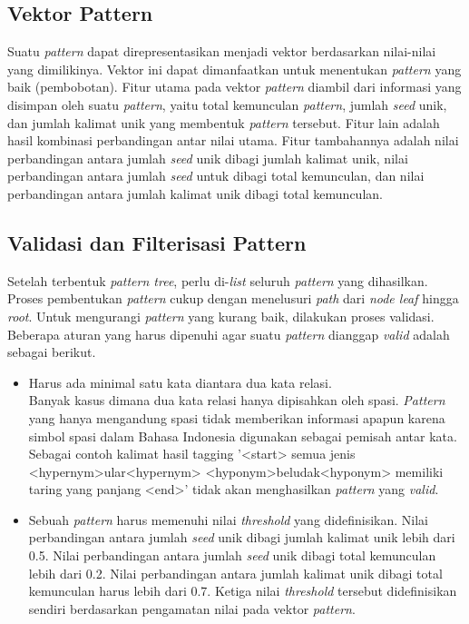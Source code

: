 \subsection{Vektor Pattern}
Suatu \textit{pattern} dapat direpresentasikan menjadi vektor berdasarkan nilai-nilai yang dimilikinya. Vektor ini dapat dimanfaatkan untuk menentukan \textit{pattern} yang baik (pembobotan). Fitur utama pada vektor \textit{pattern} diambil dari informasi yang disimpan oleh suatu \textit{pattern}, yaitu total kemunculan \textit{pattern}, jumlah \textit{seed} unik, dan jumlah kalimat unik yang membentuk \textit{pattern} tersebut. Fitur lain adalah hasil kombinasi perbandingan antar nilai utama. Fitur tambahannya adalah nilai perbandingan antara jumlah \textit{seed} unik dibagi jumlah kalimat unik, nilai perbandingan antara jumlah \textit{seed} untuk dibagi total kemunculan, dan nilai perbandingan antara jumlah kalimat unik dibagi total kemunculan.

\subsection{Validasi dan Filterisasi Pattern}
Setelah terbentuk \textit{pattern tree}, perlu di-\textit{list} seluruh \textit{pattern} yang dihasilkan. Proses pembentukan \textit{pattern} cukup dengan menelusuri \textit{path} dari \textit{\textit{node} leaf} hingga \textit{root}. Untuk mengurangi \textit{pattern} yang kurang baik, dilakukan proses validasi. Beberapa aturan yang harus dipenuhi agar suatu \textit{pattern} dianggap \textit{valid} adalah sebagai berikut.
\begin{itemize}
  \item Harus ada minimal satu kata diantara dua kata relasi. \\
  Banyak kasus dimana dua kata relasi hanya dipisahkan oleh spasi. \textit{Pattern} yang hanya mengandung spasi tidak memberikan informasi apapun karena simbol spasi dalam Bahasa Indonesia digunakan sebagai pemisah antar kata. Sebagai contoh kalimat hasil tagging '<start> semua jenis <hypernym>ular<hypernym> <hyponym>beludak<hyponym> memiliki taring yang panjang <end>' tidak akan menghasilkan \textit{pattern} yang \textit{valid}.
  \item Sebuah \textit{pattern} harus memenuhi nilai \textit{threshold} yang didefinisikan. Nilai perbandingan antara jumlah \textit{seed} unik dibagi jumlah kalimat unik lebih dari 0.5. Nilai perbandingan antara jumlah \textit{seed} unik dibagi total kemunculan lebih dari 0.2. Nilai perbandingan antara jumlah kalimat unik dibagi total kemunculan harus lebih dari 0.7. Ketiga nilai \textit{threshold} tersebut didefinisikan sendiri berdasarkan pengamatan nilai pada vektor \textit{pattern}.
\end{itemize}

